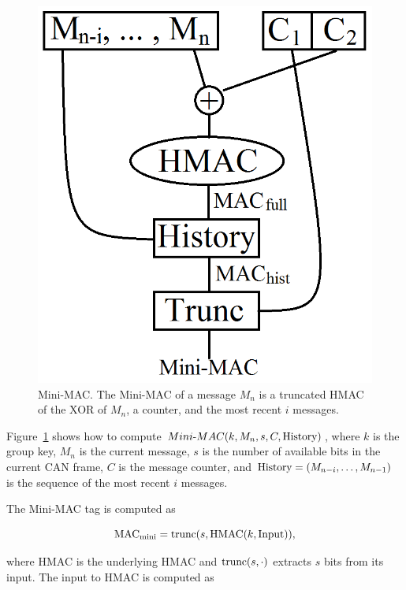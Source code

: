 	\begin{figure}
		\centering
		\includegraphics[width=\columnwidth]{figures/minimac_diagram.png}
		\caption{Mini-MAC. The Mini-MAC of a message $M_n$ is a truncated HMAC of 
		the XOR of $M_n$, a counter, and the most recent $i$ messages.}
		\label{fig-minimac}
	\end{figure}

Figure~\ref{fig-minimac} shows how to compute 
$Mini\hbox{-}MAC(k,M_n,s,C,\hbox{History})$, 
where $k$ is the group key, 
$M_n$ is the current message, 
$s$ is the number of available bits in the current CAN frame, 
$C$ is the message counter, 
and $\hbox{History} = (M_{n-i}, \ldots, M_{n-1})$ is the sequence of the most recent
$i$ messages.

The Mini-MAC tag is computed as

\begin{equation}
\text{MAC}_{\text{mini}} = \hbox{trunc(}s,\text{HMAC}(k,\text{Input})),
\end{equation}

\noindent where HMAC is the underlying HMAC and $\hbox{trunc}(s,\cdot)$
extracts $s$ bits from its input.  The input to HMAC is computed as

